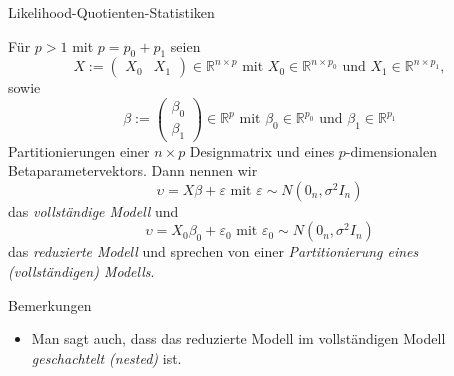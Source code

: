 \documentclass[
  8pt,
  ignorenonframetext,
]{beamer}
\providecommand{\tightlist}{%
  \setlength{\itemsep}{0pt}\setlength{\parskip}{0pt}}
\begin{document}
\begin{frame}{Likelihood-Quotienten-Statistiken}
\protect\hypertarget{likelihood-quotienten-statistiken-2}{}
\footnotesize
\begin{definition}
Für $p > 1$ mit $p = p_0 + p_1$ seien
\begin{equation}
X := \begin{pmatrix} X_0 & X_1 \end{pmatrix}  \in \mathbb{R}^{n \times p}
\mbox{ mit }
X_0 \in \mathbb{R}^{n \times p_0}
\mbox{ und }
X_1 \in \mathbb{R}^{n \times p_1},
\end{equation}
sowie
\begin{equation}
\beta := \begin{pmatrix} \beta_0 \\ \beta_1 \end{pmatrix} \in \mathbb{R}^p
\mbox{ mit }
\beta_0 \in \mathbb{R}^{p_0}
\mbox{ und }
\beta_1 \in \mathbb{R}^{p_1}
\end{equation}
Partitionierungen einer $n \times p$ Designmatrix und eines $p$-dimensionalen
Betaparametervektors. Dann nennen wir
\begin{equation}
\upsilon = X\beta + \varepsilon \mbox{ mit } \varepsilon \sim N(0_n,\sigma^2I_n)
\end{equation}
das \textit{vollständige Modell} und
\begin{equation}
\upsilon = X_0\beta_0 + \varepsilon_0 \mbox{ mit } \varepsilon_0 \sim N(0_n,\sigma^2I_n)
\end{equation}
das \textit{reduzierte Modell} und sprechen von einer \textit{Partitionierung eines
(vollständigen) Modells}.
\end{definition}

Bemerkungen

\begin{itemize}
\tightlist
\item
  Man sagt auch, dass das reduzierte Modell im vollständigen Modell
  \textit{geschachtelt (nested)} ist.
\end{itemize}
\end{frame}
\end{document}
